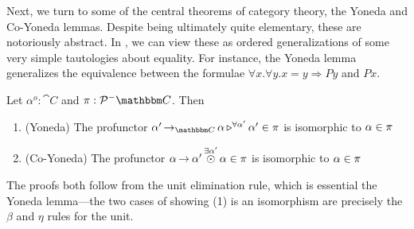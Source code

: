 \documentclass{llncs}
\begin{document}
Next, we turn to some of the central theorems of category theory, the
Yoneda and Co-Yoneda lemmas. Despite being ultimately quite elementary,
these are notoriously abstract. In \ohol{}, we can view these as
ordered generalizations of some very simple tautologies about
equality. For instance, the Yoneda lemma generalizes
the equivalence between the formulae $\forall x. \forall y. x = y
\Rightarrow P y$ and $P x$.
\begin{lemma} \label{lem:yoneda}
  Let $\alpha^o : \cat C$ and $\pi : \negPresheaf {\cat C}$. Then
  \begin{enumerate}
  \item (Yoneda) The profunctor $\homrallXYtoZ {\alpha'} {\punitinXfromYtoZ {\cat C} {\alpha'}{\alpha}} {\negPresheafAppPtoX \pi {\alpha'}}$ is isomorphic to $\alpha\in \pi$
  \item (Co-Yoneda) The profunctor $\alpha \mathop{\to_{}} \alpha' \mathop{\overset{\exists \alpha'}\odot} \alpha\in \pi$ is isomorphic to $\alpha\in \pi$
  \end{enumerate}
\end{lemma}
The proofs both follow from the unit elimination rule, which is
essential the Yoneda lemma---the two cases of showing (1) is an
isomorphism are precisely the $\beta$ and $\eta$ rules for the unit.
\end{document}
